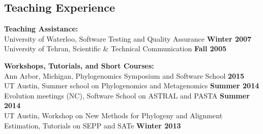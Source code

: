 \documentclass[margin,line,letterpaper]{resume}
\begin{document}
\begin{resume}

    \section{\mysidestyle Teaching Experience}

    \textbf{Teaching  Assistance:}\vspace{2mm}\\\vspace{1mm}%
    University of Waterloo, Software Testing and Quality Assurance  \hfill \textbf{Winter 2007}\vspace{1mm}\\
    University of Tehran, Scientific \& Technical Communication  \hfill \textbf{Fall 2005}


    \textbf{Workshops, Tutorials, and  Short Courses:}\vspace{2mm}\\\vspace{1mm}%
    Ann Arbor, Michigan, Phylogenomics Symposium and Software School \hfill \textbf{2015}\\
    UT Austin, Summer school on Phylogenomics and Metagenomics \hfill \textbf{Summer 2014}\\
    Evolution meetings (NC), Software School on ASTRAL and PASTA \hfill \textbf{Summer 2014}\\
    UT Austin, Workshop on New Methods for Phylogeny and Alignment Estimation, 
    Tutorials on SEPP and SATe \hfill \textbf{Winter 2013}
%


\end{resume}
\end{document}
